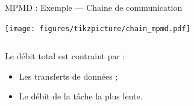 \documentclass[../main.tex]{subfiles}
\begin{document}
\begin{frame}{MPMD : Exemple --- Chaine de communication}
  \begin{center}
    \texttt{[image: figures/tikzpicture/chain\_mpmd.pdf]}
  \end{center}

  \vspace{1 em}

  \begin{columns}
    \begin{column}{.5\linewidth}
      Le débit total est contraint par :
      \begin{itemize}
        \item Les transferts de données ;
        \item Le débit de la tâche la plus lente.
      \end{itemize}
    \end{column}
  \end{columns}
\end{frame}
\end{document}
